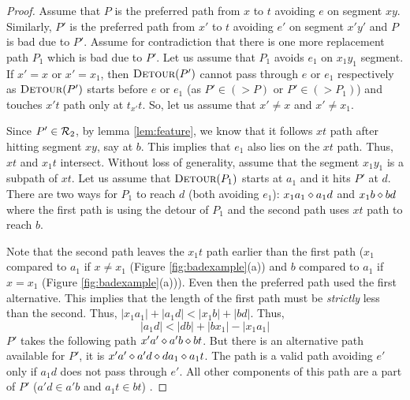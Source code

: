 \iflong
  \begin{proof}

  Assume that $P$ is the preferred path
  from $x$ to $t$ avoiding $e$ on segment $xy$. Similarly, $P'$ is the preferred path from $x'$ to $t$ avoiding $e'$ on segment $x'y'$ and $P$ is bad due to $P'$. Assume for contradiction that there is one more replacement
  path $P_1$ which is bad
  due to $P'$.
  Let us assume that $P_1$ avoids $e_1$ on $x_1y_1$ segment.
  If $x' = x$ or $ x'= x_1$, then $\textsc{Detour}(P')$ cannot pass through
  $e$ or $e_1$ respectively as
  $\textsc{Detour}(P')$ starts before $e$ or $e_{1}$ (as $P' \in (>P)$ or $P' \in (>P_1)$) and touches $x't$ path only at $t_{x'}t$. So, let us assume
  that $x' \neq x$ and $ x' \neq x_1$.

  Since $P' \in \mathcal{R}_2$, by lemma \ref{lem:feature}, we know
  that it follows $xt$ path after hitting segment $xy$, say at $b$. This
  implies
  that $e_1$ also lies on the $xt$ path. Thus, $xt$ and $x_1t$
  intersect. Without loss of generality, assume that  the segment $x_1y_1$ is
  a subpath of $xt$.
  Let us assume that $\textsc{Detour}(P_1)$ starts at $a_1$ and it
  hits $P'$ at $d$.
  There are two ways for $P_1$ to reach $d$ (both avoiding
  $e_1$):
  $x_1a_1 \diamond a_1d$ and $x_1b \diamond bd$
  where the first path is using the detour of $P_1$ and the second path
  uses $xt$ path to reach $b$.

  Note that the second path leaves the $x_1t$ path earlier than the
  first path ($x_1$ compared to $a_1$ if $x \neq x_1$ (Figure  \ref{fig:badexample}(a)) and
  $b$ compared to $a_1$ if $x=x_1$ (Figure  \ref{fig:badexample}(a))). Even then the preferred
  path used the first alternative.
  This implies that the length of the first path
  must be {\em strictly} less than the second.  Thus,
  $|x_1a_1| + |a_1d| < |x_1b| + |bd|$. Thus,
  \begin{equation}
  |a_1d| < |db| + |bx_1| - |x_1a_1|
  \end{equation}
  $P'$ takes the following path
  $x'a' \diamond a'b \diamond bt$.
  But there is  an alternative path available for $P'$, it
  is $x'a' \diamond a'd \diamond da_1 \diamond a_1t$.
  The path is a valid path avoiding $e'$ only if $a_1d$
  does not pass through $e'$. All other components of this
  path are a part of $P'$ ($a'd \in a'b$ and $a_1t \in bt$)
  .


\end{proof}
